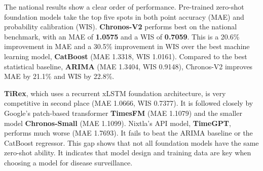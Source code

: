 The national results show a clear order of performance. Pre-trained zero-shot foundation models take the top five spots in both point accuracy (MAE) and probability calibration (WIS). \textbf{Chronos-V2} performs best on the national benchmark, with an MAE of \textbf{1.0575} and a WIS of \textbf{0.7059}. This is a 20.6\% improvement in MAE and a 30.5\% improvement in WIS over the best machine learning model, \textbf{CatBoost} (MAE 1.3318, WIS 1.0161). Compared to the best statistical baseline, \textbf{ARIMA} (MAE 1.3404, WIS 0.9148), Chronos-V2 improves MAE by 21.1\% and WIS by 22.8\%.

\textbf{TiRex}, which uses a recurrent xLSTM foundation architecture, is very competitive in second place (MAE 1.0666, WIS 0.7377). It is followed closely by Google's patch-based transformer \textbf{TimesFM} (MAE 1.1079) and the smaller model \textbf{Chronos-Small} (MAE 1.1099). Nixtla's API model, \textbf{TimeGPT}, performs much worse (MAE 1.7693). It fails to beat the ARIMA baseline or the CatBoost regressor. This gap shows that not all foundation models have the same zero-shot ability. It indicates that model design and training data are key when choosing a model for disease surveillance.

